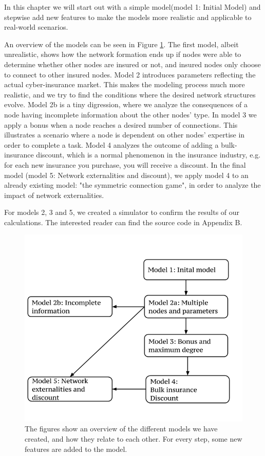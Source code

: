 In this chapter we will start out with a simple model(model 1: Initial Model) and stepwise add new features to make the models more realistic and applicable to real-world scenarios.

An overview of the models can be seen in Figure \ref{fig:Overview-of-models}. The first model, albeit unrealistic, shows how the network formation ends up if nodes were able to determine whether other nodes are insured or not, and insured nodes only choose to connect to other insured nodes. 
Model 2 introduces parameters reflecting the actual cyber-insurance market. This makes the modeling process much more realistic, and we try to find the conditions where the desired network structures evolve. Model 2b is a tiny digression, where we analyze the consequences of a node having incomplete information about the other nodes' type. 
In model 3 we apply a bonus when a node reaches a desired number of connections. This illustrates a scenario where a node is dependent on other nodes' expertise in order to complete a task.
Model 4 analyzes the outcome of adding a bulk-insurance discount, which is a normal phenomenon in the insurance industry, e.g. for each new insurance you purchase, you will receive a discount. 
In the final model (model 5: Network externalities and discount), we apply model 4 to an already existing model: "the symmetric connection game", in order to analyze the impact of network externalities.

 For models 2, 3 and 5, we created a simulator to confirm the results of our calculations. The interested reader can find the source code in Appendix B.
\begin{figure}[h]
\centering
  \includegraphics[width=0.9\linewidth]{../Figures/modeloverview.png}
  \caption[The figures show an overview of the different models we have created, and how they relate to each other.]{\label{fig:Overview-of-models} The figures show an overview of the different models we have created, and how they relate to each other. For every step, some new features are added to the model.}

\end{figure}

